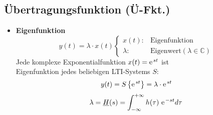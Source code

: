   \subsection{Übertragungsfunktion (Ü-Fkt.)}\label{ufkt}
  \begin{itemize}      
      \item{\textbf{Eigenfunktion}}\\
          \[
              y(t) = \lambda\cdot x(t)
              \begin{cases}
                  x(t): & \text{Eigenfunktion}\\
                  \lambda: & \text{Eigenwert}(\lambda\in\mathbb{C})
              \end{cases}
          \]
            Jede komplexe Exponentialfunktion $x(t) = \e^{st}$ ist\\ Eigenfunktion
          jedes beliebigen LTI-Systems $S$:
          \[
          y(t) = S\left\{ \e^{st} \right\} = \lambda\cdot \e^{st}
          \]
          \[
          \lambda = \underline{H}(s) = \int_{-\infty}^{+\infty} h(\tau)\  \e^{-st} d\tau
          \]
  \end{itemize}

